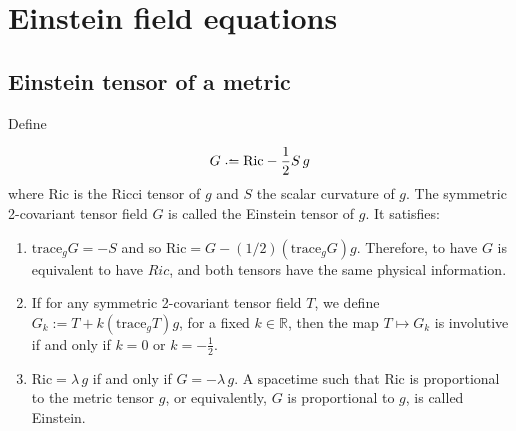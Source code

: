 \chapter{Einstein field equations}

\section{Einstein tensor of a metric}

Define

\[
	G \defeq \mathrm{Ric}-\frac{1}{2}S\,g
\]
where Ric is the Ricci tensor of $g$ and $S$ the scalar curvature of $g$. The symmetric 2-covariant tensor field $G$ is called the Einstein tensor of $g$. It satisfies:

\begin{enumerate}
	\item $\mathrm{trace}_gG=-S$ and so $\mathrm{Ric}=G-(1/2)(\mathrm{trace}_gG)g$. Therefore, to have $G$ is equivalent to have $Ric$, and both tensors have the same physical information.
	\item If for any symmetric 2-covariant tensor field $T$, we define $G_k:=T+k(\mathrm{trace}_gT)g$, for a fixed $k\in \mathbb{R}$, then the map $T \longmapsto G_k$ is involutive if and only if $k=0$ or $k=-\frac{1}{2}$.
	\item $\mathrm{Ric}=\lambda\,g$ if and only if $G=-\lambda\,g$. A spacetime such that Ric is proportional to the metric tensor $g$, or equivalently, $G$ is proportional to $g$, is called Einstein.
\end{enumerate}